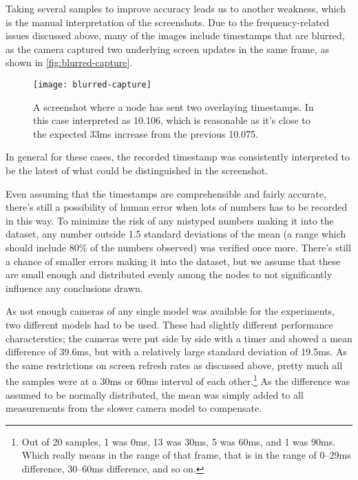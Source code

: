 Taking several samples to improve accuracy leads us to another weakness, which is the manual interpretation of the screenshots. Due to the frequency-related issues discussed above, many of the images include timestamps that are blurred, as the camera captured two underlying screen updates in the same frame, as shown in \autoref{fig:blurred-capture}.

\begin{figure}
    \centering
    \texttt{[image: blurred-capture]}
    \caption{A screenshot where a node has sent two overlaying timestamps. In this case interpreted as 10.106, which is reasonable as it's close to the expected 33ms increase from the previous 10.075.}
    \label{fig:blurred-capture}
\end{figure}

In general for these cases, the recorded timestamp was consistently interpreted to be the latest of what could be distinguished in the screenshot.

Even assuming that the timestamps are comprehensible and fairly accurate, there's still a possibility of human error when lots of numbers has to be recorded in this way. To minimize the risk of any mistyped numbers making it into the dataset, any number outside 1.5 standard deviations of the mean (a range which should include 80\% of the numbers observed) was verified once more. There's still a chance of smaller errors making it into the dataset, but we assume that these are small enough and distributed evenly among the nodes to not significantly influence any conclusions drawn.

As not enough cameras of any single model was available for the experiments, two different models had to be used. These had slightly different performance characterstics; the cameras were put side by side with a timer and showed a mean difference of 39.6ms, but with a relatively large standard deviation of 19.5ms. As the same restrictions on screen refresh rates as discussed above, pretty much all the samples were at a 30ms or 60ms interval of each other.\footnote{Out of 20 samples, 1 was 0ms, 13 was 30ms, 5 was 60ms, and 1 was 90ms. Which really means in the range of that frame, that is in the range of 0--29ms difference, 30--60ms difference, and so on.} As the difference was assumed to be normally distributed, the mean was simply added to all measurements from the slower camera model to compensate.

